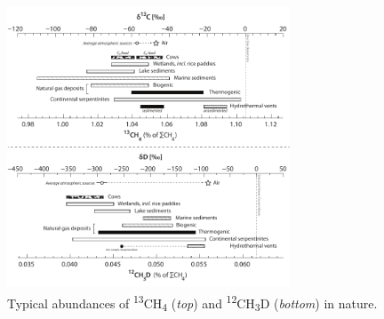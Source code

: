 
\begin{figure}
	\centering
	\includegraphics[width=0.75\textwidth]{figures/Fig1.NA.pdf}
	\captionsetup{format=myformat}	%
	\caption[Natural abundances of singly-substituted methane isotopologues]{Typical abundances of \textsuperscript{13}CH\textsubscript{4} (\textit{top}) and \textsuperscript{12}CH\textsubscript{3}D (\textit{bottom}) in nature.}
	\label{fig:1:NA}
\end{figure}
